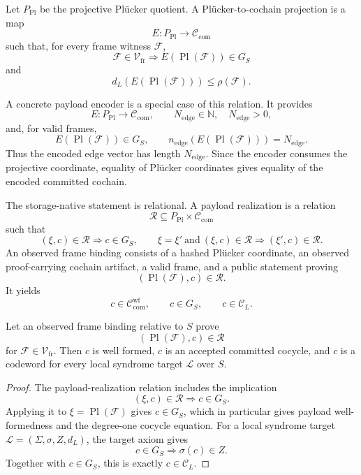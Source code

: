 \begin{definition}\label{def:plucker-cochain-projection}
Let \(P_{\mathrm{Pl}}\) be the projective Pl\"ucker quotient. A
Pl\"ucker-to-cochain projection is a map
\[
  E:P_{\mathrm{Pl}}\longrightarrow \mathcal C_{\mathrm{com}}
\]
such that, for every frame witness \(\mathcal F\),
\[
  \mathcal F\in\mathcal V_{\mathrm{fr}}
  \Longrightarrow
  E(\operatorname{Pl}(\mathcal F))\in G_S
\]
and
\[
  d_L(E(\operatorname{Pl}(\mathcal F)))\le \rho(\mathcal F).
\]
\end{definition}

A concrete payload encoder is a special case of this relation. It provides
\[
  E:P_{\mathrm{Pl}}\to \mathcal C_{\mathrm{com}},
  \qquad N_{\mathrm{edge}}\in\mathbb N,\quad N_{\mathrm{edge}}>0,
\]
and, for valid frames,
\[
  E(\operatorname{Pl}(\mathcal F))\in G_S,
  \qquad
  n_{\mathrm{edge}}(E(\operatorname{Pl}(\mathcal F)))=N_{\mathrm{edge}}.
\]
Thus the encoded edge vector has length \(N_{\mathrm{edge}}\). Since the
encoder consumes the projective coordinate, equality of Pl\"ucker coordinates
gives equality of the encoded committed cochain.

The storage-native statement is relational. A payload realization is a relation
\[
  \mathcal R\subseteq P_{\mathrm{Pl}}\times \mathcal C_{\mathrm{com}}
\]
such that
\[
  (\xi,c)\in\mathcal R
  \Longrightarrow c\in G_S,
  \qquad
  \xi=\xi'\ \text{and}\ (\xi,c)\in\mathcal R
  \Longrightarrow
  (\xi',c)\in\mathcal R.
\]
An observed frame binding consists of a hashed Pl\"ucker coordinate, an observed
proof-carrying cochain artifact, a valid frame, and a public statement proving
\[
  (\operatorname{Pl}(\mathcal F),c)\in\mathcal R.
\]
It yields
\[
  c\in\mathcal C_{\mathrm{com}}^{\mathrm{wf}},\qquad
  c\in G_S,\qquad
  c\in\mathcal C_L.
\]

\begin{proposition}
\label{prop:observed-binding-codeword}
Let an observed frame binding relative to \(S\) prove
\[
  (\operatorname{Pl}(\mathcal F),c)\in\mathcal R
\]
for \(\mathcal F\in\mathcal V_{\mathrm{fr}}\).
Then \(c\) is well formed, \(c\) is an accepted committed cocycle, and \(c\) is a
codeword for every local syndrome target \(\mathcal L\) over \(S\).
\end{proposition}

\begin{proof}
The payload-realization relation includes the implication
\[
  (\xi,c)\in\mathcal R
  \Longrightarrow c\in G_S.
\]
Applying it to \(\xi=\operatorname{Pl}(\mathcal F)\) gives
\(c\in G_S\), which in particular gives payload well-formedness and the
degree-one cocycle equation. For a local syndrome target
\(\mathcal L=(\Sigma,\sigma,Z,d_L)\), the target axiom gives
\[
  c\in G_S\Longrightarrow \sigma(c)\in Z.
\]
Together with \(c\in G_S\), this is exactly \(c\in\mathcal C_L\).
\end{proof}

